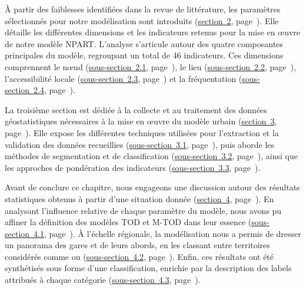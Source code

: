 \begin{refsegment}
À partir des faiblesses identifiées dans la revue de littérature, les paramètres sélectionnés pour notre modélisation sont introduits (\hyperref[chap6:selection-indicateurs]{section~2}, page~\pageref{chap6:selection-indicateurs}). Elle détaille les différentes dimensions et les indicateurs retenus pour la mise en œuvre de notre modèle \acrfull{NPART}. L’analyse s’articule autour des quatre composantes principales du modèle, regroupant un total de 46 indicateurs. Ces dimensions comprennent le nœud (\hyperref[chap6:methodologie-indicateurs-node]{sous-section~2.1}, page~\pageref{chap6:methodologie-indicateurs-node}), le lieu (\hyperref[chap6:methodologie-indicateurs-place]{sous-section~2.2}, page~\pageref{chap6:methodologie-indicateurs-place}), l’accessibilité locale (\hyperref[chap6:methodologie-indicateurs-accessibility]{sous-section~2.3}, page~\pageref{chap6:methodologie-indicateurs-accessibility}) et la fréquentation (\hyperref[chap6:methodologie-indicateurs-frequentation]{sous-section~2.4}, page~\pageref{chap6:methodologie-indicateurs-frequentation}).%

La troisième section est dédiée à la collecte et au traitement des données géostatistiques nécessaires à la mise en œuvre du modèle urbain (\hyperref[chap6:methodologie-m-tod-index]{section~3}, page~\pageref{chap6:methodologie-m-tod-index}). Elle expose les différentes techniques utilisées pour l’extraction et la validation des données recueillies (\hyperref[chap6:methodologie-statistiques]{sous-section~3.1}, page~\pageref{chap6:methodologie-statistiques}), puis aborde les méthodes de segmentation et de classification (\hyperref[chap6:methodologie-statistiques-clusterisation-classification]{sous-section~3.2}, page~\pageref{chap6:methodologie-statistiques-clusterisation-classification}), ainsi que les approches de pondération des indicateurs (\hyperref[chap6:methodologie-ponderation-indicateurs]{sous-section~3.3}, page~\pageref{chap6:methodologie-ponderation-indicateurs}).%

Avant de conclure ce chapitre, nous engageons une discussion autour des résultats statistiques obtenus à partir d'une situation donnée (\hyperref[chap6:resultats-modele]{section~4}, page~\pageref{chap6:resultats-modele}). En analysant l’influence relative de chaque paramètre du modèle, nous avons pu affiner la définition des modèles \acrshort{TOD} et \acrshort{M-TOD} dans leur essence (\hyperref[chap6:results-influence-indicateurs]{sous-section~4.1}, page~\pageref{chap6:results-influence-indicateurs}). À l’échelle régionale, la modélisation nous a permis de dresser un panorama des gares et de leurs abords, en les classant entre territoires considérés comme  ou  (\hyperref[chap6:results-caracterisation-gares]{sous-section~4.2}, page~\pageref{chap6:results-caracterisation-gares}). Enfin, ces résultats ont été synthétisés sous forme d’une classification, enrichie par la description des labels attribués à chaque catégorie (\hyperref[chap6:results-classification-gares]{sous-section~4.3}, page~\pageref{chap6:results-classification-gares}).%


\end{refsegment}
